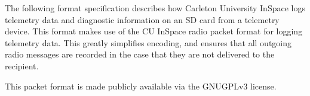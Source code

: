The following format specification describes how Carleton University InSpace logs telemetry data and diagnostic
information on an SD card from a telemetry device. This format makes use of the CU InSpace radio packet format for
logging telemetry data. This greatly simplifies encoding, and ensures that all outgoing radio messages are recorded in
the case that they are not delivered to the recipient.

This packet format is made publicly available via the GNUGPLv3 license.
